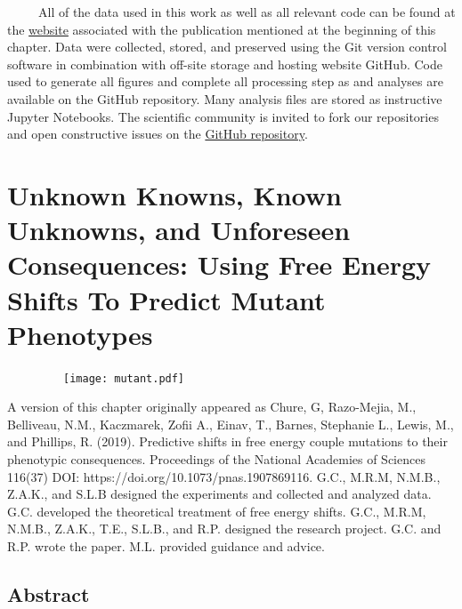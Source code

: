 \documentclass[12pt]{caltech_thesis}
\begin{document}
~~~~~All of the data used in this work as well as all relevant code can
be found at the
\href{http://rpgroup-pboc.github.io/mwc_induction}{website} associated
with the publication mentioned at the beginning of this chapter. Data
were collected, stored, and preserved using the Git version control
software in combination with off-site storage and hosting website
GitHub. Code used to generate all figures and complete all processing
step as and analyses are available on the GitHub repository. Many
analysis files are stored as instructive Jupyter Notebooks. The
scientific community is invited to fork our repositories and open
constructive issues on the
\href{https://www.github.com/rpgroup-pboc/mwc_induction}{GitHub
repository}.

\hypertarget{unknown-knowns-known-unknowns-and-unforeseen-consequences-using-free-energy-shifts-to-predict-mutant-phenotypes}{%
\chapter{Unknown Knowns, Known Unknowns, and Unforeseen Consequences:
Using Free Energy Shifts To Predict Mutant
Phenotypes}\label{unknown-knowns-known-unknowns-and-unforeseen-consequences-using-free-energy-shifts-to-predict-mutant-phenotypes}}

~~~~~~~~~\texttt{[image: mutant.pdf]}

A version of this chapter originally appeared as Chure, G, Razo-Mejia,
M., Belliveau, N.M., Kaczmarek, Zofii A., Einav, T., Barnes, Stephanie
L., Lewis, M., and Phillips, R. (2019). Predictive shifts in free energy
couple mutations to their phenotypic consequences. Proceedings of the
National Academies of Sciences 116(37) DOI:
https://doi.org/10.1073/pnas.1907869116. G.C., M.R.M, N.M.B., Z.A.K.,
and S.L.B designed the experiments and collected and analyzed data. G.C.
developed the theoretical treatment of free energy shifts. G.C., M.R.M,
N.M.B., Z.A.K., T.E., S.L.B., and R.P. designed the research project.
G.C. and R.P. wrote the paper. M.L. provided guidance and advice.

\hypertarget{abstract-1}{%
\section{Abstract}\label{abstract-1}}
\end{document}
